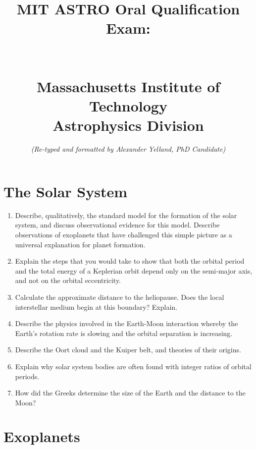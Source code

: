 \documentclass[11pt, oneside]{book}
\title{
    \textbf{MIT ASTRO Oral Qualification Exam:} \\
    \text{The 168 Questions} \\
    [0.1cm]
    \hRule{1.0pt} \\
    \vspace*{1\baselineskip}
    {\normalsize \color{black} 
    Massachusetts Institute of Technology \\ 
    Astrophysics Division}
    \vspace*{15\baselineskip}}
\author{\textit{(Re-typed and formatted by Alexander Yelland, PhD Candidate)}}
\date{}
\begin{document}
\maketitle 


\setcounter{page}{1}

\section{The Solar System}

\begin{enumerate}[start=1, itemsep=0.4cm]
    \item Describe, qualitatively, the standard model for the formation of the solar system, and discuss observational evidence for this model. Describe observations of exoplanets that have challenged this simple picture as a universal explanation for planet formation.
    \item Explain the steps that you would take to show that both the orbital period and the total energy of a Keplerian orbit depend only on the semi-major axis, and not on the orbital eccentricity.
    \item Calculate the approximate distance to the heliopause. Does the local interstellar medium begin at this boundary? Explain.
    \item Describe the physics involved in the Earth-Moon interaction whereby the Earth's rotation rate is slowing and the orbital separation is increasing.
    \item Describe the Oort cloud and the Kuiper belt, and theories of their origins.
    \item Explain why solar system bodies are often found with integer ratios of orbital periods.
    \item How did the Greeks determine the size of the Earth and the distance to the Moon?
\end{enumerate}

\section{Exoplanets}
\end{document}
